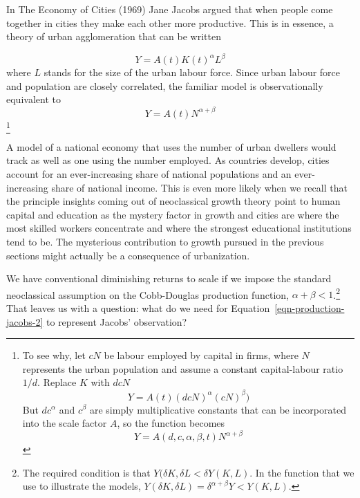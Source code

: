 
In The Economy of Cities (1969) Jane Jacobs argued that when people come together in cities they make each other more productive. This is in essence, a theory of urban agglomeration that can be written

\begin{equation}
Y = A(t) K(t)^\alpha L^\beta 
\label{eqn-production-jacobs}
\end{equation}
where $L$ stands for the size of the urban labour force. Since urban labour force and population are closely correlated, the familiar model is observationally equivalent to
\begin{equation}
Y = A(t)N^{\alpha+\beta}
\label{eqn-production-jacobs-2}
\end{equation}
\footnote{ To see why, let  $cN$ be labour employed by capital in firms, where $N$ represents the urban population and assume a constant capital-labour ratio $1/d$. Replace $K$ with $dcN$
\[Y = A(t) (dcN)^\alpha (cN)^\beta) \]
But  $dc^\alpha$ and $c^\beta$ are simply multiplicative constants that can be incorporated into the scale factor $A$, so the function becomes 
\[Y = A(d, c,\alpha, \beta, t)N^{\alpha+\beta}\]
}

A model of a national economy that uses the number of urban dwellers would track as well as one using the number employed. As countries develop, cities account for an ever-increasing share of  national populations and an ever-increasing share of national income.  This is  even more likely when we recall that the principle insights coming out of neoclassical growth theory point to human capital and education as the mystery factor in growth and cities are where the most skilled workers concentrate and where the strongest educational institutions tend to be. The mysterious contribution to growth pursued in the previous sections might  actually be a consequence of urbanization.

We have conventional diminishing returns to scale  if we impose the standard neoclassical assumption on the \gls{Cobb-Douglas} production function, 
$\alpha +\beta <1 $.\footnote{
The required condition is that 
$Y(\delta K,\delta L< \delta Y(K,L)$. 
In the function that we use to illustrate the models, 
$Y(\delta K,\delta L)= \delta^{\alpha +\beta}Y < Y(K,L)$.} 
That leaves us with a question: what do we need for Equation~\ref{eqn-production-jacobs-2} to represent Jacobs' observation?  

